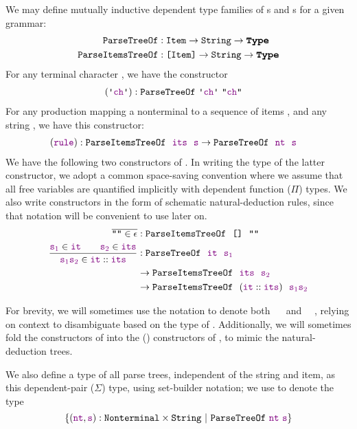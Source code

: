     We may define mutually inductive dependent type families of s and s for a given grammar:
    \begin{align*}
      \indname{ParseTreeOf} & \oftypesep \indname{Item} \typeto \String \typeto \Type \\
      \indname{ParseItemsTreeOf} & \oftypesep \typelist{\indname{Item}} \typeto \String \typeto \Type
    \end{align*}
    For any terminal character , we have the constructor
    \begin{align*}
      (\terminal{\farg{ch}}) & \oftypesep \indname{ParseTreeOf}~\terminal{\farg{ch}}~\str{\farg{ch}}
    \end{align*}
    For any production  mapping a nonterminal  to a sequence of items , and any string , we have this constructor:
    \begin{align*}
      & (\textcolor{violet}{\texttt{rule}}) : \texttt{ParseItemsTreeOf}~~\textcolor{violet}{\texttt{its}}~~\textcolor{violet}{\texttt{s}} \to \texttt{ParseTreeOf}~~\textcolor{violet}{\texttt{nt}}~~\textcolor{violet}{\texttt{s}}
    \end{align*}
    We have the following two constructors of .  In writing the type of the latter constructor, we adopt a common space-saving convention where we assume that all free variables are quantified implicitly with dependent function ($\Pi$) types.  We also write constructors in the form of schematic natural-deduction rules, since that notation will be convenient to use later on.
    \begin{align*}
      \overline{\str{}\in\epsilon} & \oftypesep \indname{ParseItemsTreeOf}~~\nil~~\str{} \\
      \frac{\farg{s$_1$}\in \farg{it}\qquad \farg{s$_2$}\in \farg{its}}{\strcat{\farg{s$_1$}}{\farg{s$_2$}}\in \cons{\farg{it}}{\farg{its}}} & \oftypesep \indname{ParseTreeOf}~~\farg{it}~~\farg{s$_1$} \\
      & \typeto \indname{ParseItemsTreeOf}~~\farg{its}~~\farg{s$_2$} \\
      & \typeto
      \indname{ParseItemsTreeOf}~~(\cons{\farg{it}}{\farg{its}})~~\strcat{\farg{s$_1$}}{\farg{s$_2$}}
    \end{align*}

    For brevity, we will sometimes use the notation  to denote both ~~ and ~~, relying on context to disambiguate based on the type of .  Additionally, we will sometimes fold the constructors of  into the () constructors of , to mimic the natural-deduction trees.

    We also define a type of all parse trees, independent of the string and item, as this dependent-pair ($\Sigma$) type, using set-builder notation; we use  to denote the type
    $$\left\{\oftype{(\farg{nt}, \farg{s})}{\typeprod{\Nonterminal}{\String}}\ \middle|\ \indname{ParseTreeOf}~\farg{nt}~\farg{s}\right\}$$